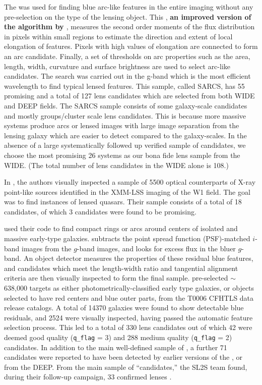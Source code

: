 \documentclass[useAMS,usenatbib,a4paper]{mn2e}
\begin{document}
The \af \citep{More2012} was used for finding blue arc-like features in
the entire \cfhtls imaging without any pre-selection on the type of the lensing
object. This \af, {\bf an improved version of the algorithm by
\citet{Alard2006}}, measures the second order moments of the flux distribution
in pixels within small regions to estimate the direction and extent of local
elongation of features. Pixels with high values of elongation are connected to
form an arc candidate. Finally, a set of thresholds on arc properties such as
the area, length, width, curvature and surface brightness are used to select
arc-like candidates. The search was carried out in the g-band which is the most
efficient wavelength to find typical lensed features.  This sample, called
SARCS, has 55 promising and a total of 127 lens candidates which are selected
from both \cfhtls WIDE and DEEP fields. The SARCS sample consists of some
galaxy-scale candidates and mostly groups/cluster scale lens candidates. This is
because more massive systems produce arcs or lensed images with large image
separation from the lensing galaxy which are easier to detect compared to the
galaxy-scales. In the absence of a large systematically followed up
verified sample of candidates, we choose the most promising 26 systems
as our bona fide lens sample from the \cfhtls WIDE.
(The total number of lens candidates in the \cfhtls WIDE alone is 108.)

In \citet{Elyiv2013}, the authors visually inspected a sample of 5500 optical
counterparts of X-ray point-like sources identified in the XMM-LSS
imaging of the \cfhtls W1 field. The goal was to find instances
of lensed quasars. Their sample consists of a total of 18 candidates,
of which 3 candidates were found to be promising.

\citet{Gavazzi2014} used their \rf code to find compact rings or arcs
around centers of isolated and massive early-type galaxies. \rf
subtracts the point spread function (PSF)-matched $i$-band images from the $g$-band images, and
looks for excess flux in the bluer $g$-band. An object detector measures
the properties of these residual blue features, and candidates which
meet the length-width ratio and tangential alignment criteria are then
visually inspected to form the final sample. \citet{Gavazzi2014}
pre-selected $\sim$638,000 targets as either photometrically-classified
early type galaxies, or objects selected to have red centers and blue
outer parts, from the T0006 CFHTLS data release catalogs. A total of
14370 galaxies were found to show detectable blue residuals, and 2524
were visually inspected, having passed the automatic feature selection
process. This led to a total of 330 lens candidates out of which 42 were deemed
good quality (\texttt{q\_flag} = 3) and 288  medium quality
(\texttt{q\_flag} = 2) candidates. In addition to the main well-defined
sample of \citet{Gavazzi2014}, a further 71 candidates were reported to
have been detected by earlier versions of the \rf, or from the \cfhtls DEEP.
From the main sample of ``\rf candidates,'' the SL2S team found, during
their follow-up campaign, 33 confirmed lenses \citep{Sonnenfeld2013a,Sonnenfeld2013b}.
\end{document}
